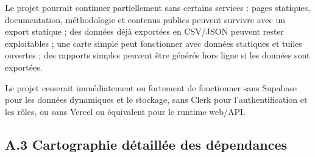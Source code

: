 \documentclass[
  10pt,
  a4paper,
  DIV=11,
  numbers=noendperiod,
  oneside]{scrreprt}
\begin{document}
Le projet pourrait continuer partiellement sans certains services :
pages statiques, documentation, méthodologie et contenus publics peuvent
survivre avec un export statique ; des données déjà exportées en
CSV/JSON peuvent rester exploitables ; une carte simple peut fonctionner
avec données statiques et tuiles ouvertes ; des rapports simples peuvent
être générés hors ligne si les données sont exportées.

Le projet cesserait immédiatement ou fortement de fonctionner sans
Supabase pour les données dynamiques et le stockage, sans Clerk pour
l'authentification et les rôles, ou sans Vercel ou équivalent pour le
runtime web/API.

\subsection{A.3 Cartographie détaillée des
dépendances}\label{a.3-cartographie-duxe9tailluxe9e-des-duxe9pendances}
\end{document}
